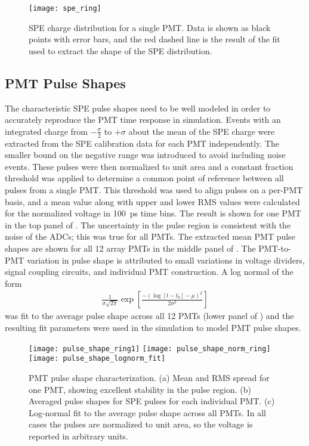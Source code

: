 \begin{figure}
	\centering
	\texttt{[image: spe\_ring]}
	\caption{SPE charge distribution for a single PMT. Data is shown as black points with error bars, and the red dashed line is the result of the fit used to extract the shape of the SPE distribution. }
	\label{fig:spe_data}
\end{figure}


\subsection{PMT Pulse Shapes}
\label{sec:pmtpulses}
The characteristic SPE pulse shapes need to be well modeled in order to accurately reproduce the PMT time response in simulation. 
Events with an integrated charge from $-\frac{\sigma}{2}$ to $+\sigma$ about the mean of the SPE charge were extracted from the SPE calibration data for each PMT independently. 
The smaller bound on the negative range was introduced to avoid including noise events. 
These pulses were then normalized to unit area and a constant fraction threshold was applied to determine a common point of reference between all pulses from a single PMT.  
This threshold was used to align pulses on a per-PMT basis, and a mean value along with upper and lower RMS values were calculated for the normalized voltage in 100~ps time bins.
The result is shown for one PMT in the top panel of . 
The uncertainty in the pulse region is consistent with the noise of the ADCs; this was true for all PMTs. 
The extracted mean PMT pulse shapes are shown for all 12 array PMTs in the middle panel of . 
The PMT-to-PMT variation in pulse shape is attributed to small variations in voltage dividers, signal coupling circuits, and individual PMT construction. 
A log normal of the form 
\begin{eqnarray}
\frac{1}{\sigma \sqrt{2\pi}}\exp{\left[\frac{-\left(\log[t-t_0]-\mu\right)^2}{2\sigma^2}\right]}
\end{eqnarray}
was fit to the average pulse shape across all 12 PMTs (lower panel of ) and the resulting fit parameters were used in the simulation to model PMT pulse shapes.
	
\begin{figure}
	\centering
	\texttt{[image: pulse\_shape\_ring1]}
	\texttt{[image: pulse\_shape\_norm\_ring]}
	\texttt{[image: pulse\_shape\_lognorm\_fit]}
	\caption{PMT pulse shape characterization.   
	(a) Mean and RMS spread for one PMT, showing excellent stability in the pulse region.  
	(b) Averaged pulse shapes for SPE pulses for each individual PMT. 
	(c) Log-normal fit to the average pulse shape across all PMTs. 
	In all cases the pulses are normalized to unit area, so the voltage is reported in arbitrary units.}
	\label{fig:spe-pulse-shape}
\end{figure}


